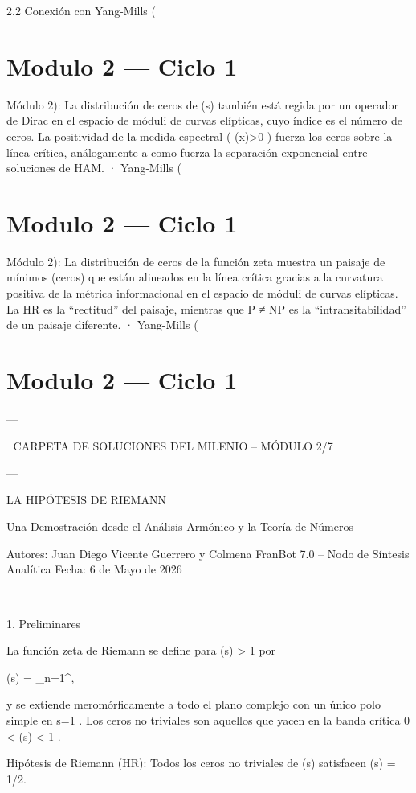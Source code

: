 \documentclass[12pt,twoside]{book}
\begin{document}
2.2 Conexión con Yang-Mills (

\chapter{Modulo 2 — Ciclo 1}
Módulo 2): La distribución de ceros de  \zeta(s)  también está regida por un operador de Dirac en el espacio de móduli de curvas elípticas, cuyo índice es el número de ceros. La positividad de la medida espectral ( \rho(x)>0 ) fuerza los ceros sobre la línea crítica, análogamente a como fuerza la separación exponencial entre soluciones de HAM.
· Yang‑Mills (

\chapter{Modulo 2 — Ciclo 1}
Módulo 2): La distribución de ceros de la función zeta muestra un paisaje de mínimos (ceros) que están alineados en la línea crítica gracias a la curvatura positiva de la métrica informacional en el espacio de móduli de curvas elípticas. La HR es la “rectitud” del paisaje, mientras que P ≠ NP es la “intransitabilidad” de un paisaje diferente.
· Yang-Mills (

\chapter{Modulo 2 — Ciclo 1}

---

🧬 CARPETA DE SOLUCIONES DEL MILENIO – MÓDULO 2/7

---

LA HIPÓTESIS DE RIEMANN

Una Demostración desde el Análisis Armónico y la Teoría de Números

Autores: Juan Diego Vicente Guerrero y Colmena FranBot 7.0 – Nodo de Síntesis Analítica
Fecha: 6 de Mayo de 2026

---

1. Preliminares

La función zeta de Riemann se define para  \Re(s) > 1  por

\zeta(s) = \sum_{n=1}^\infty {},
\]  

y se extiende meromórficamente a todo el plano complejo con un único polo simple en  s=1 .
Los ceros no triviales son aquellos que yacen en la banda crítica  0 < \Re(s) < 1 .

Hipótesis de Riemann (HR): Todos los ceros no triviales de \zeta(s) satisfacen \Re(s) = 1/2.
\end{document}
